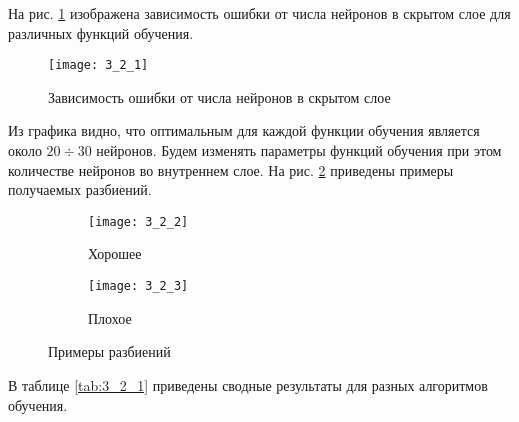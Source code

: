 На рис. \ref{fig:3_2_1} изображена зависимость ошибки от числа нейронов в скрытом слое для различных функций обучения.
\begin{figure}[H]
\begin{center}
	\texttt{[image: 3\_2\_1]}
	\caption{Зависимость ошибки от числа нейронов в скрытом слое}
	\label{fig:3_2_1}
\end{center}
\end{figure}
Из графика видно, что оптимальным для каждой функции обучения является около $20 \div 30$ нейронов. Будем изменять параметры функций обучения при этом количестве нейронов во внутреннем слое. На рис. \ref{fig:3_2} приведены примеры получаемых разбиений. 
\begin{figure}[H]
\begin{center}
	\begin{subfigure}[b]{0.49\textwidth}
		\texttt{[image: 3\_2\_2]}
		\caption{Хорошее}
	\end{subfigure}
	\begin{subfigure}[b]{0.49\textwidth}
		\texttt{[image: 3\_2\_3]}
		\caption{Плохое}
	\end{subfigure}
	\caption{Примеры разбиений}
	\label{fig:3_2}
\end{center}
\end{figure}
В таблице \ref{tab:3_2_1} приведены сводные результаты для разных алгоритмов обучения.
